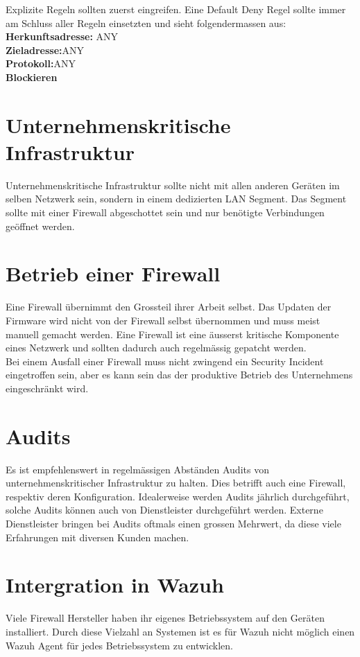 Explizite Regeln sollten zuerst eingreifen.
Eine Default Deny Regel sollte immer am Schluss aller Regeln einsetzten und sieht folgendermassen aus:\\
\textbf{Herkunftsadresse:} \quad ANY\\
\textbf{Zieladresse:}\quad\quad\quad\quad ANY\\
\textbf{Protokoll:}\quad\quad\quad\quad\quad ANY\\
\textbf{Blockieren}


\section{Unternehmenskritische Infrastruktur}
Unternehmenskritische Infrastruktur sollte nicht mit allen anderen Geräten im selben Netzwerk sein, sondern in einem dedizierten LAN Segment.
Das Segment sollte mit einer Firewall abgeschottet sein und nur benötigte Verbindungen geöffnet werden.

\section{Betrieb einer Firewall}
Eine Firewall übernimmt den Grossteil ihrer Arbeit selbst.
Das Updaten der Firmware wird nicht von der Firewall selbst übernommen und muss meist manuell gemacht werden.
Eine Firewall ist eine äusserst kritische Komponente eines Netzwerk und sollten dadurch auch regelmässig gepatcht werden.\\

Bei einem Ausfall einer Firewall muss nicht zwingend ein Security Incident eingetroffen sein, aber es kann sein das der produktive Betrieb des Unternehmens eingeschränkt wird.

\section{Audits}
Es ist empfehlenswert in regelmässigen Abständen Audits von unternehmenskritischer Infrastruktur zu halten.
Dies betrifft auch eine Firewall, respektiv deren Konfiguration.
Idealerweise werden Audits jährlich durchgeführt, solche Audits können auch von Dienstleister durchgeführt werden.
Externe Dienstleister bringen bei Audits oftmals einen grossen Mehrwert, da diese viele Erfahrungen mit diversen Kunden machen.

\section{Intergration in Wazuh}
Viele Firewall Hersteller haben ihr eigenes Betriebssystem auf den Geräten installiert.
Durch diese Vielzahl an Systemen ist es für Wazuh nicht möglich einen Wazuh Agent für jedes Betriebssystem zu entwicklen.

